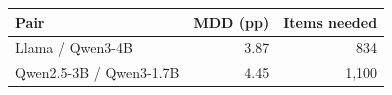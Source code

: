 \begin{tabular}{lrr}
\toprule
Pair & MDD (pp) & Items needed \\
\midrule
Llama / Qwen3-4B & 3.87 & 834 \\
Qwen2.5-3B / Qwen3-1.7B & 4.45 & 1,100 \\
\bottomrule
\end{tabular}
